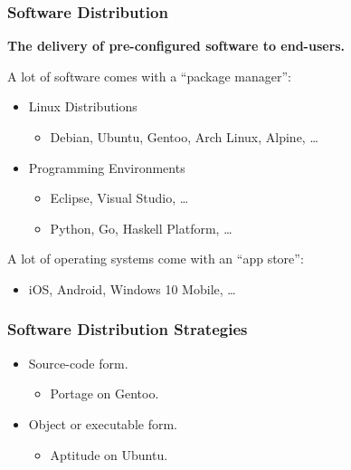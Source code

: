 \begin{frame}

\frametitle{Software Distribution}

\begin{center}

\large \textbf{The delivery of pre-configured software to end-users.}

\end{center}

\vspace{\fill}

A lot of software comes with a ``package manager'':

\begin{itemize}

\item Linux Distributions

\begin{itemize}

\item Debian, Ubuntu, Gentoo, Arch Linux, Alpine, \ldots

\end{itemize}

\item Programming Environments

\begin{itemize}

\item Eclipse, Visual Studio, \ldots

\item Python, Go, Haskell Platform, \ldots

\end{itemize}

\end{itemize}

A lot of operating systems come with an ``app store'':

\begin{itemize}

\item iOS, Android, Windows 10 Mobile, \ldots

\end{itemize}

\end{frame}


\begin{frame}

\frametitle{Software Distribution Strategies}

\begin{itemize}

\item Source-code form.

\begin{itemize}

\item Portage on Gentoo.

\end{itemize}

\item Object or executable form.

\begin{itemize}

\item Aptitude on Ubuntu.

\end{itemize}

\end{itemize}

\end{frame}

